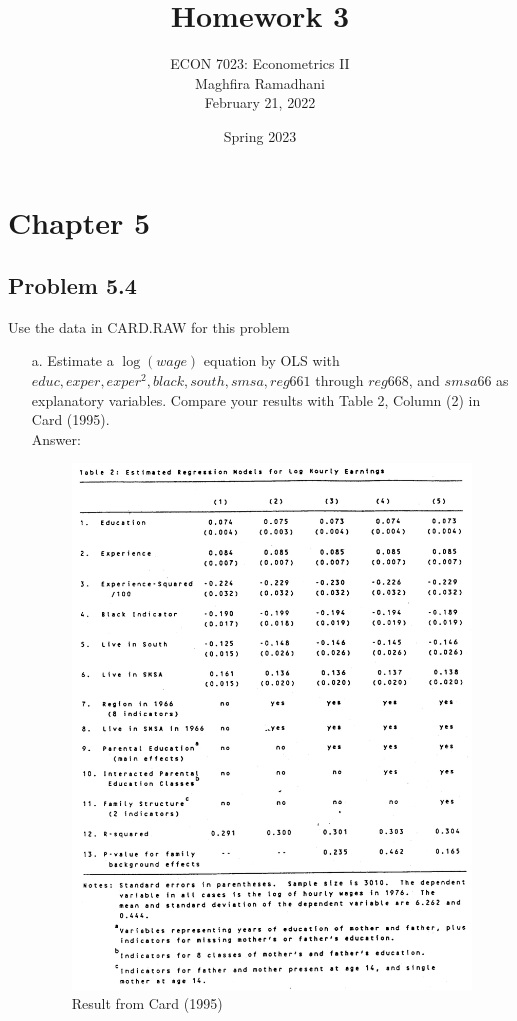 \documentclass[10pt]{article}
\begin{document}
 
\title{Homework 3}
\author{ECON 7023: Econometrics II\\
Maghfira Ramadhani\\
February 21, 2022}
\date{Spring 2023}
\maketitle

\section*{Chapter 5}
\subsection*{Problem 5.4}
Use the data in CARD.RAW for this problem
\begin{enumerate}
\item[a.] Estimate a $\log(wage)$ equation by OLS with $educ, exper, exper^2, black, south, smsa, reg661$ through $reg668$, and $smsa66$ as explanatory variables. Compare your results with Table 2, Column (2) in Card (1995).
\\ Answer:
\begin{figure}[h]
    \caption{Result from Card (1995)} \label{Fig3.1}
    \centering
    \includegraphics[scale=0.23]{table2.png}

\end{figure}
\end{enumerate}
\end{document}

